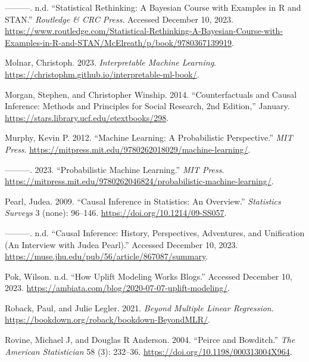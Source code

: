 \documentclass[
  letterpaper,
]{krantz}
\newlength{\cslhangindent}
\newenvironment{CSLReferences}[2] %
 {\begin{list}{}{%
  \setlength{\itemindent}{0pt}
  \setlength{\leftmargin}{0pt}
  \setlength{\parsep}{0pt}
  \ifodd #1
   \setlength{\leftmargin}{\cslhangindent}
   \setlength{\itemindent}{-1\cslhangindent}
  \fi
  \setlength{\itemsep}{#2\baselineskip}}}
 {\end{list}}
\begin{document}
\begin{CSLReferences}{1}{0}
---------. n.d. {``Statistical {Rethinking}: {A} {Bayesian} {Course}
with {Examples} in {R} and {STAN}.''} \emph{Routledge \& CRC Press}.
Accessed December 10, 2023.
\url{https://www.routledge.com/Statistical-Rethinking-A-Bayesian-Course-with-Examples-in-R-and-STAN/McElreath/p/book/9780367139919}.

Molnar, Christoph. 2023. \emph{Interpretable {Machine} {Learning}}.
\url{https://christophm.github.io/interpretable-ml-book/}.

Morgan, Stephen, and Christopher Winship. 2014. {``Counterfactuals and
{Causal} {Inference}: {Methods} and {Principles} for {Social}
{Research}, 2nd {Edition},''} January.
\url{https://stars.library.ucf.edu/etextbooks/298}.

Murphy, Kevin P. 2012. {``Machine {Learning}: {A} {Probabilistic}
{Perspective}.''} \emph{MIT Press}.
\url{https://mitpress.mit.edu/9780262018029/machine-learning/}.

---------. 2023. {``Probabilistic {Machine} {Learning}.''} \emph{MIT
Press}.
\url{https://mitpress.mit.edu/9780262046824/probabilistic-machine-learning/}.

Pearl, Judea. 2009. {``Causal Inference in Statistics: {An} Overview.''}
\emph{Statistics Surveys} 3 (none): 96--146.
\url{https://doi.org/10.1214/09-SS057}.

---------. n.d. {``Causal {Inference}: {History}, {Perspectives},
{Adventures}, and {Unification} ({An} {Interview} with {Judea}
{Pearl}).''} Accessed December 10, 2023.
\url{https://muse.jhu.edu/pub/56/article/867087/summary}.

Pok, Wilson. n.d. {``How Uplift Modeling Works {\textbar} {Blogs}.''}
Accessed December 10, 2023.
\url{https://ambiata.com/blog/2020-07-07-uplift-modeling/}.

Roback, Paul, and Julie Legler. 2021. \emph{Beyond {Multiple} {Linear}
{Regression}}. \url{https://bookdown.org/roback/bookdown-BeyondMLR/}.

Rovine, Michael J, and Douglas R Anderson. 2004. {``Peirce and
{Bowditch}.''} \emph{The American Statistician} 58 (3): 232--36.
\url{https://doi.org/10.1198/000313004X964}.


\end{CSLReferences}
\end{document}
